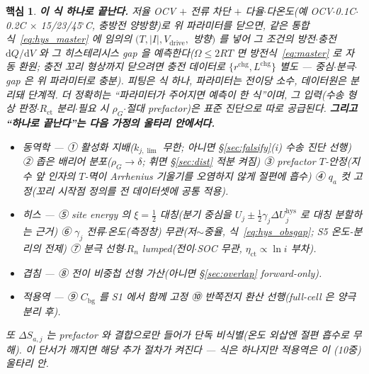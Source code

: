 \documentclass[11pt,a4paper]{article}
\newtheorem*{keybox}{핵심}
\newcommand{\dd}{\mathrm{d}}
\newcommand{\drive}{\mathrm{drive}}
\newcommand{\bg}{\mathrm{bg}}
\newcommand{\chg}{\mathrm{chg}}
\newcommand{\hys}{\mathrm{hys}}
\begin{document}
\begin{keybox}
\textbf{이 식 하나로 끝난다.} 저율 OCV $+$ 전류 차단 $+$ 다율$\cdot$다온도(예 OCV$\cdot$0.1C$\cdot$0.2C $\times$
15/23/45$^\circ$C, 충방전 양방향)로 위 파라미터를 닫으면, \emph{같은 통합식~\eqref{eq:hys_master} 에 임의의}
$(T,|I|,V_\drive,$ 방향$)$ 를 넣어 그 조건의 \emph{방전$\cdot$충전} $\dd Q/\dd V$ 와 그 히스테리시스 gap 을
\emph{예측}한다($\Omega\le2RT$ 면 방전식~\eqref{eq:master} 로 자동 환원; 충전 \emph{꼬리 형상}까지 닫으려면 충전
데이터로 $\{r^{\chg},L^{\chg}\}$ 별도 — 중심$\cdot$분극$\cdot$gap 은 위 파라미터로 충분). 피팅은 식 하나, 파라미터는 전이당 소수,
데이터원은 분리돼 단계적. 더 정확히는 ``\emph{파라미터가 주어지면 예측이 한 식}''이며, 그 \emph{입력}(수송 형상
판정$\cdot$$R_\mathrm{ct}$ 분리$\cdot$필요 시 $\rho_G$$\cdot$절대 prefactor)은 표준 진단으로 따로 공급된다. \textbf{그리고
``하나로 끝난다''는 다음 가정의 울타리 안에서다.}
\begin{itemize}[leftmargin=1.6em,itemsep=1pt,topsep=2pt]
\item \emph{동역학} — ① 활성화 지배($k_{j,\lim}$ 무한; 아니면 \S\ref{sec:falsify}(i) 수송 진단 선행) ② 좁은
  배리어 분포($\rho_G\to\delta$; 휘면 \S\ref{sec:dist} 적분 켜짐) ③ prefactor $T$-안정(지수 앞 인자의 $T$-멱이
  Arrhenius 기울기를 오염하지 않게 절편에 흡수) ④ $q_a$ 컷 고정(꼬리 시작점 정의를 전 데이터셋에 공통 적용).
\item \emph{히스} — ⑤ site energy 의 $\xi=\tfrac12$ 대칭(분기 중심을 $U_j\pm\tfrac12\gamma_j\Delta U_j^\hys$ 로
  대칭 분할하는 근거) ⑥ $\gamma_j$ 전류$\cdot$온도(측정창) 무관(저$\sim$중율, 식~\eqref{eq:hys_obsgap}; S5
  온도-분리의 전제) ⑦ 분극 선형$\cdot$$R_n$ lumped(전이$\cdot$SOC 무관, $\eta_\mathrm{ct}\propto\ln i$ 부차).
\item \emph{겹침} — ⑧ 전이 비중첩 선형 가산(아니면 \S\ref{sec:overlap} forward-only).
\item \emph{적용역} — ⑨ $C_\bg$ 를 S1 에서 함께 고정 ⑩ \emph{반쪽전지} 환산 선행(full-cell 은 양극 분리 후).
\end{itemize}
또 $\Delta S_{a,j}$ 는 prefactor 와 결합으로만 들어가 \emph{단독 비식별}(온도 외삽엔 절편
흡수로 무해). 이 단서가 깨지면 해당 추가 절차가 켜진다 — \emph{식은 하나지만 적용역은 이 (10중) 울타리 안}.
\end{keybox}
\end{document}
